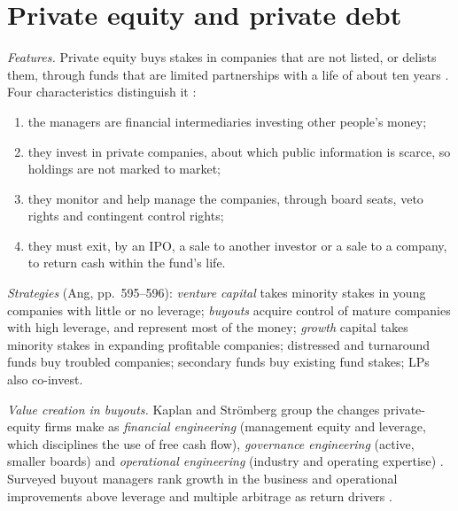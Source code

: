 \section{Private equity and private debt}

\begin{qfdefinition}\label{def:private-equity-features}
 \emph{Features.} Private equity buys stakes in companies that are not listed, or delists them, through funds that are limited partnerships with a life of about ten years \citep[pp.~594--595]{s7-ang}. Four characteristics distinguish it \citep[pp.~5--7]{metrick-yasuda-survey-2011}:
\begin{enumerate}
\item the managers are financial intermediaries investing other people's money;
\item they invest in private companies, about which public information is scarce, so holdings are not marked to market;
\item they monitor and help manage the companies, through board seats, veto rights and contingent control rights;
\item they must exit, by an IPO, a sale to another investor or a sale to a company, to return cash within the fund's life.
\end{enumerate}

\emph{Strategies} (Ang, pp.~595--596): \emph{venture capital} takes minority stakes in young companies with little or no leverage; \emph{buyouts} acquire control of mature companies with high leverage, and represent most of the money; \emph{growth} capital takes minority stakes in expanding profitable companies; distressed and turnaround funds buy troubled companies; secondary funds buy existing fund stakes; LPs also co-invest.

\emph{Value creation in buyouts.} Kaplan and Str\"omberg group the changes private-equity firms make as \emph{financial engineering} (management equity and leverage, which disciplines the use of free cash flow), \emph{governance engineering} (active, smaller boards) and \emph{operational engineering} (industry and operating expertise) \citep[NBER WP 14207, pp.~13--16]{pe-kaplan-stromberg-2009}. Surveyed buyout managers rank growth in the business and operational improvements above leverage and multiple arbitrage as return drivers \citep[NBER WP 21133, p.~27]{w5-gompers-kaplan-mukharlyamov}.


\end{qfdefinition}
